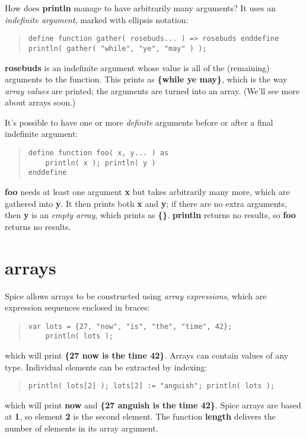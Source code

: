 \documentclass{report}
\begin{document}
How does {\bf println} manage to have arbitrarily many arguments? It uses an
{\em indefinite argument}, marked with ellipsis notation:

\begin{quote}
\begin{verbatim}
define function gather( rosebuds... ) => rosebuds enddefine
println( gather( "while", "ye", "may" ) );
\end{verbatim}
\end{quote}
{\bf rosebuds} is an indefinite argument whose value is all of the (remaining)
arguments to the function. This prints as {\bf \{while ye may\}}, which
is the way {\em array values} are printed; the arguments are turned into an array.
(We'll see more about arrays soon.)

It's possible to have one or more {\em definite} arguments before or after a final
indefinite argument:

\begin{quote}
\begin{verbatim}
define function foo( x, y... ) as
    println( x ); println( y )
enddefine
\end{verbatim}
\end{quote}
{\bf foo} needs at least one argument {\bf x} but takes arbitrarily many more, which
are gathered into {\bf y}. It then prints both {\bf x} and {\bf y}; if there are no extra
arguments, then {\bf y} is an {\em empty array}, which prints as {\bf \{\}}. {\bf println}
returns no results, so {\bf foo} returns no results.\chapter{arrays}


Spice allows arrays to be constructed using {\em array expressions}, which are
expression sequences enclosed in braces:

\begin{quote}
\begin{verbatim}
var lots = {27, "now", "is", "the", "time", 42};
    println( lots );
\end{verbatim}
\end{quote}
which will print {\bf \{27 now is the time 42\}}. Arrays can contain values of any
type. Individual elements can be extracted by indexing:

\begin{quote}
\begin{verbatim}
println( lots[2] ); lots[2] := "anguish"; println( lots );
\end{verbatim}
\end{quote}
which will print {\bf now} and {\bf \{27 anguish is the time 42\}}. Spice arrays are
based at {\bf 1}, so element {\bf 2} is the second element. The function
{\bf length} delivers the number of elements in its array argument.
\end{document}
